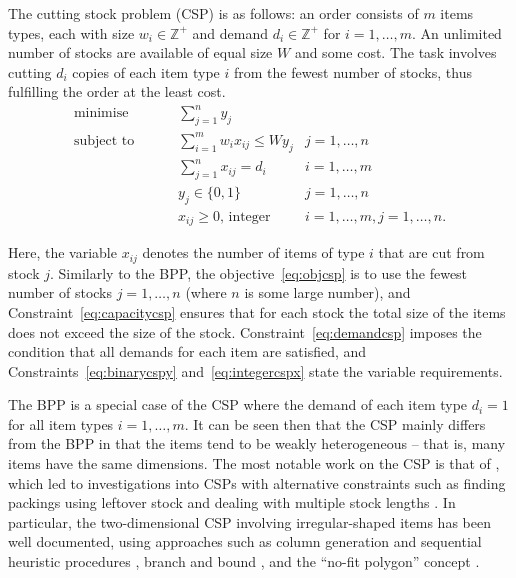 \documentclass[a4paper,11pt]{article}
\begin{document}
\noindent The cutting stock problem (CSP) is as follows: an order consists of $m$ items types, each with size $w_i \in \mathbb{Z}^+$ and demand $d_i \in \mathbb{Z}^+$ for $i = 1,\dotsc,m$. An unlimited number of stocks are available of equal size $W$ and some cost. The task involves cutting $d_i$ copies of each item type $i$ from the fewest number of stocks, thus fulfilling the order at the least cost.
\begin{subequations}
	\begin{align}
	\text{minimise  } &\qquad \sum_{j=1}^n y_j & \label{eq:objcsp} \\[3pt]
	\text{subject to  } &\qquad \sum_{i=1}^m w_i x_{ij} \leq Wy_j  & j=1,\dotsc,n  \label{eq:capacitycsp} \\[3pt]
	&\qquad \sum_{j=1}^{n} x_{ij} = d_i & i = 1,\dotsc,m \label{eq:demandcsp} \\[3pt]
	&\qquad y_j \in \{0,1\} &j = 1,\dotsc,n \label{eq:binarycspy} \\[3pt]
	&\qquad x_{ij} \geq 0 \text{, integer} &i=1,\dotsc,m,j = 1,\dotsc,n. \label{eq:integercspx}
	\end{align}
\end{subequations}

\noindent Here, the variable $x_{ij}$ denotes the number of items of type $i$ that are cut from stock $j$. Similarly to the BPP, the objective~\eqref{eq:objcsp} is to use the fewest number of stocks $j=1,\dotsc,n$ (where $n$ is some large number), and Constraint~\eqref{eq:capacitycsp} ensures that for each stock the total size of the items does not exceed the size of the stock. Constraint~\eqref{eq:demandcsp} imposes the condition that all demands for each item are satisfied, and Constraints~\eqref{eq:binarycspy} and~\eqref{eq:integercspx} state the variable requirements.

The BPP is a special case of the CSP where the demand of each item type $d_i =1$ for all item types $i=1,\dotsc,m$. It can be seen then that the CSP mainly differs from the BPP in that the items tend to be weakly heterogeneous -- that is, many items have the same dimensions. The most notable work on the CSP is that of \citet{gilmore1961, gilmore1963}, which led to investigations into CSPs with alternative constraints such as finding packings using leftover stock \citep{cui2017} and dealing with multiple stock lengths \citep{belov2002, poldi2009}. In particular, the two-dimensional CSP involving irregular-shaped items has been well documented, using approaches such as column generation and sequential heuristic procedures \citep{song2014}, branch and bound \citep{alvarez2013}, and the ``no-fit polygon'' concept \citep{bennell2001}. 
\end{document}
